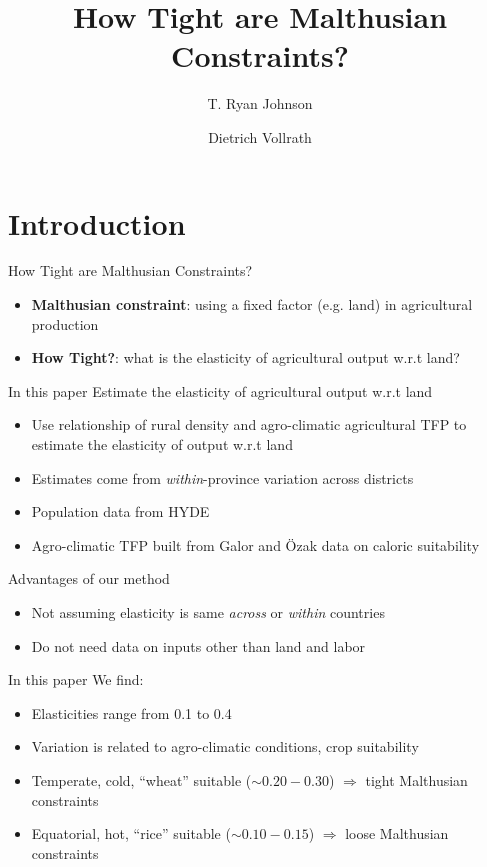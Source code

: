 \documentclass[10pt, xcolor=dvipsnames]{beamer}
\title[Land Constraints]{{How Tight are Malthusian Constraints?}}
\author[Johnson \& Vollrath]{T. Ryan Johnson \inst{1} \and Dietrich Vollrath \inst{2}}
\institute[UH]{\inst{1} University of Houston \and %
                      \inst{2} University of Houston}
\date[June 2017]{}
\begin{document}
\maketitle

\section{Introduction}

\begin{frame}{How Tight are Malthusian Constraints?}\label{define}

\begin{itemize}
  \item \textbf{Malthusian constraint}: using a fixed factor (e.g. land) in agricultural production
  \item \textbf{How Tight?}: what is the elasticity of agricultural output w.r.t land?
\end{itemize}

\end{frame}


\begin{frame}{In this paper}
Estimate the elasticity of agricultural output w.r.t land
\begin{itemize}
  \item Use relationship of rural density and agro-climatic agricultural TFP to estimate the elasticity of output w.r.t land
  \item Estimates come from \textit{within}-province variation across districts
  \item Population data from HYDE
  \item Agro-climatic TFP built from Galor and {\"O}zak data on caloric suitability
\end{itemize}

\vspace{.2cm} Advantages of our method
\begin{itemize}
  \item Not assuming elasticity is same \textit{across} or \textit{within} countries
  \item Do not need data on inputs other than land and labor
\end{itemize}

\end{frame}

\begin{frame}{In this paper}
We find:
\begin{itemize}
  \item Elasticities range from 0.1 to 0.4
  \item Variation is related to agro-climatic conditions, crop suitability
  \item Temperate, cold, ``wheat'' suitable ($\sim 0.20-0.30$) $\Rightarrow$ tight Malthusian constraints
  \item Equatorial, hot, ``rice'' suitable ($\sim 0.10-0.15$) $\Rightarrow$ loose Malthusian constraints
\end{itemize}

\end{frame}
\end{document}

